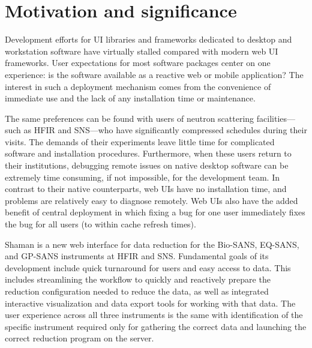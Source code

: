 \section{Motivation and significance}
\label{motivation}

Development efforts for UI libraries and frameworks dedicated to desktop and workstation software
have virtually stalled compared with modern web UI frameworks. User expectations for most software
packages center on one experience: is the software available as a reactive web or mobile
application? The interest in such a deployment mechanism comes from the convenience of immediate use
and the lack of any installation time or maintenance. 

The same preferences can be found with users of neutron scattering facilities—such as HFIR and
SNS—who have significantly compressed schedules during their visits. The demands of their
experiments leave little time for complicated software and installation procedures. Furthermore,
when these users return to their institutions, debugging remote issues on native desktop software
can be extremely time consuming, if not impossible, for the development team. In contrast to their
native counterparts, web UIs have no installation time, and problems are relatively easy to diagnose
remotely. Web UIs also have the added benefit of central deployment in which fixing a bug for one
user immediately fixes the bug for all users (to within cache refresh times).

Shaman is a new web interface for data reduction for the Bio-SANS, EQ-SANS, and GP-SANS instruments
at HFIR and SNS. Fundamental goals of its development include quick turnaround for users and easy
access to data. This includes streamlining the workflow to quickly and reactively prepare the
reduction configuration needed to reduce the data, as well as integrated interactive visualization
and data export tools for working with that data. The user experience across all three instruments
is the same with identification of the specific instrument required only for gathering the correct
data and launching the correct reduction program on the server. 